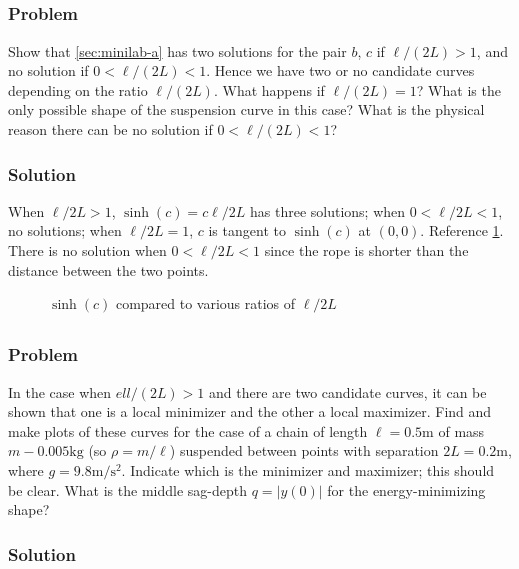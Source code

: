 \documentclass[12pt,twoside]{article}
\begin{document}
\subsection{}
\subsubsection*{Problem}
Show that \cref{sec:minilab-a} has two solutions for the pair $b$, $c$ if
$\ell/(2L)>1$, and no solution if $0<\ell/(2L)<1$. Hence we have two or no
candidate curves depending on the ratio $\ell/(2L)$. What happens if
$\ell/(2L)=1$? What is the only possible shape of the suspension curve in this
case? What is the physical reason there can be no solution if $0<\ell/(2L)<1$?

\subsubsection*{Solution}
When $\ell/2L>1$, $\sinh(c)=c\ell/2L$ has three solutions; when $0<\ell/2L<1$,
no solutions; when $\ell/2L=1$, $c$ is tangent to $\sinh(c)$ at $(0,0)$.
Reference \cref{fig:minilab-c}. There is no solution when $0<\ell/2L<1$ since
the rope is shorter than the distance between the two points.

\begin{figure}[htp]
  \centering
  \caption{$\sinh(c)$ compared to various ratios of $\ell/2L$}
  \label{fig:minilab-c}
\end{figure}


\subsection{}
\subsubsection*{Problem}
In the case when $ell/(2L)>1$ and there are two candidate curves, it can be
shown that one is a local minimizer and the other a local maximizer. Find and
make plots of these curves for the case of a chain of length $\ell=0.5\text{m}$
of mass $m-0.005\text{kg}$ (so $\rho=m/\ell$) suspended between points with
separation $2L=0.2\text{m}$, where $g=9.8\text{m/s$^2$}$. Indicate which is the
minimizer and maximizer; this should be clear. What is the middle sag-depth
$q=|y(0)|$ for the energy-minimizing shape?

\subsubsection*{Solution}
\todo{}
\end{document}
